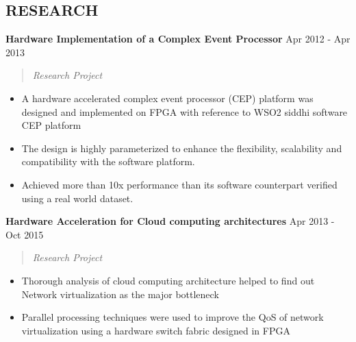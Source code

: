 \documentclass[mm]{./assets/res} %
\begin{document}
\begin{resume}

\vspace {2 mm}
\section{RESEARCH} 

\textbf{Hardware Implementation of a Complex Event Processor} \hfill Apr 2012 - Apr 2013
\begin{quote}
	\emph{Research Project}
\end{quote}

\begin{itemize} \itemsep -1pt %
	\item A hardware accelerated complex event processor (CEP) platform was designed and implemented on FPGA with reference to WSO2 siddhi software CEP platform
	\item The design is highly parameterized to enhance the flexibility, scalability and compatibility with the software platform.
	\item Achieved more than 10x performance than its software counterpart verified using a real world dataset.
\end{itemize}

\textbf{Hardware Acceleration for Cloud computing architectures} \hfill Apr 2013 - Oct 2015
\begin{quote}
\emph{Research Project}
\end{quote}

\begin{itemize} \itemsep -1pt %
\item Thorough analysis of cloud computing architecture helped to find out Network virtualization as the major bottleneck
\item Parallel processing techniques were used to improve the QoS of network virtualization using a hardware switch fabric designed in FPGA
\end{itemize}


\end{resume}
\end{document}
